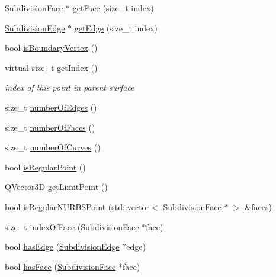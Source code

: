 \begin{DoxyCompactItemize}
\hyperlink{classShipCAD_1_1SubdivisionFace}{Subdivision\-Face} $\ast$ \hyperlink{classShipCAD_1_1SubdivisionPoint_a673d2a2c94f52e5523a012959417dcc3}{get\-Face} (size\-\_\-t index)
\item 
\hyperlink{classShipCAD_1_1SubdivisionEdge}{Subdivision\-Edge} $\ast$ \hyperlink{classShipCAD_1_1SubdivisionPoint_a518c4e3dc5de74950c87ff0f733716ba}{get\-Edge} (size\-\_\-t index)
\item 
bool \hyperlink{classShipCAD_1_1SubdivisionPoint_afbcf1244015a92be04faed20163699f7}{is\-Boundary\-Vertex} ()
\item 
virtual size\-\_\-t \hyperlink{classShipCAD_1_1SubdivisionPoint_a8406682549c10ec9e1a184132f6ed2f0}{get\-Index} ()
\begin{DoxyCompactList}\small\item\em index of this point in parent surface \end{DoxyCompactList}\item 
size\-\_\-t \hyperlink{classShipCAD_1_1SubdivisionPoint_a0bc218bf0b1982a6d622535c2653200e}{number\-Of\-Edges} ()
\item 
size\-\_\-t \hyperlink{classShipCAD_1_1SubdivisionPoint_aac07ee9bc037a35a244ab179cf7bd344}{number\-Of\-Faces} ()
\item 
size\-\_\-t \hyperlink{classShipCAD_1_1SubdivisionPoint_afc9659ec83083e7725ce14a12a74d2f0}{number\-Of\-Curves} ()
\item 
bool \hyperlink{classShipCAD_1_1SubdivisionPoint_a6a0b4b628563cda2b2979ce6222e8a20}{is\-Regular\-Point} ()
\item 
Q\-Vector3\-D \hyperlink{classShipCAD_1_1SubdivisionPoint_a0eb743069fe2ee2e99cdf7417b2400d5}{get\-Limit\-Point} ()
\item 
bool \hyperlink{classShipCAD_1_1SubdivisionPoint_a88243019864c79766266cee627671183}{is\-Regular\-N\-U\-R\-B\-S\-Point} (std\-::vector$<$ \hyperlink{classShipCAD_1_1SubdivisionFace}{Subdivision\-Face} $\ast$ $>$ \&faces)
\item 
size\-\_\-t \hyperlink{classShipCAD_1_1SubdivisionPoint_a354475f80700fee46dcb46f8602c5345}{index\-Of\-Face} (\hyperlink{classShipCAD_1_1SubdivisionFace}{Subdivision\-Face} $\ast$face)
\item 
bool \hyperlink{classShipCAD_1_1SubdivisionPoint_ada0d082be616958c024bb1743d392e2f}{has\-Edge} (\hyperlink{classShipCAD_1_1SubdivisionEdge}{Subdivision\-Edge} $\ast$edge)
\item 
bool \hyperlink{classShipCAD_1_1SubdivisionPoint_a720d2fc986ba8a365e8722e0e3e28be5}{has\-Face} (\hyperlink{classShipCAD_1_1SubdivisionFace}{Subdivision\-Face} $\ast$face)

\end{DoxyCompactItemize}
